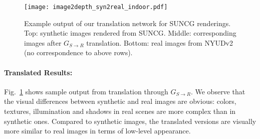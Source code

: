 \documentclass[runningheads]{llncs}
\begin{document}
\begin{figure}[tb!]
	\centering
	\texttt{[image: image2depth\_syn2real\_indoor.pdf]}
	\caption{Example output of our translation network for SUNCG\cite{song2017semantic} renderings. Top: synthetic images rendered from SUNCG. Middle: corresponding images after $G_{S\to R}$ translation. Bottom: real images from NYUDv2 \cite{silberman2012indoor} (no correspondence to above rows). 
	}
	\label{fig:syn2real_nyu}
\end{figure}

\paragraph{\bf Translated Results:} Fig.~\ref{fig:syn2real_nyu} shows sample output from translation through $G_{S\to R}$. We observe that the visual differences between synthetic and real images are obvious: colors, textures, illumination and shadows in real scenes are more complex than in synthetic ones. Compared to synthetic images, the translated versions are visually more similar to real images in terms of low-level appearance.
\end{document}
